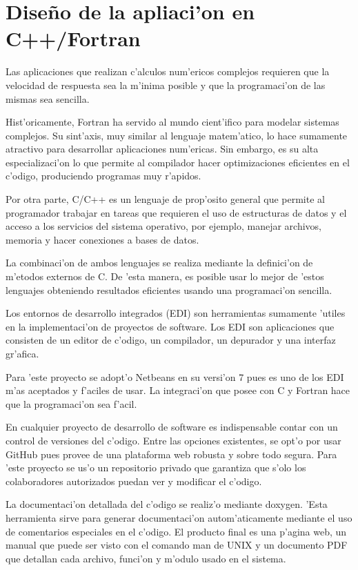 \section{Dise\~no de la apliaci'on en C++/Fortran}
  Las aplicaciones que realizan c'alculos num'ericos complejos requieren que la velocidad de respuesta sea la m'inima posible y que
  la programaci'on de las mismas sea sencilla.

  Hist'oricamente, Fortran ha servido al mundo cient'ifico para modelar sistemas complejos. Su sint'axis, 
  muy similar al lenguaje matem'atico, lo hace sumamente atractivo para desarrollar aplicaciones num'ericas. Sin embargo,
  es su alta especializaci'on lo que permite al compilador hacer optimizaciones eficientes en el c'odigo, produciendo
  programas muy r'apidos.

  Por otra parte, C/C++ es un lenguaje de prop'osito general que permite al programador trabajar en tareas que requieren
  el uso de estructuras de datos y el acceso a los servicios del sistema operativo, por ejemplo, manejar archivos, memoria y hacer 
  conexiones a bases de datos.

  La combinaci'on de ambos lenguajes se realiza mediante la definici'on de m'etodos externos de C. De 'esta manera, es posible
  usar lo mejor de 'estos lenguajes obteniendo resultados eficientes usando una programaci'on sencilla.


  Los entornos de desarrollo integrados (EDI) son herramientas sumamente 'utiles en la implementaci'on de proyectos de software.
  Los EDI son aplicaciones que consisten de un editor de c'odigo, un compilador, un depurador y una interfaz gr'afica.

  Para 'este proyecto se adopt'o Netbeans en su versi'on 7 pues es uno de los EDI m'as aceptados y f'aciles de usar. La integraci'on
  que posee con C y Fortran hace que la programaci'on sea f'acil.

  En cualquier proyecto de desarrollo de software es indispensable contar con un control de versiones del c'odigo.
  Entre las opciones existentes, se opt'o por usar GitHub pues provee de una plataforma web robusta y sobre todo segura. 
  Para 'este proyecto se us'o un repositorio privado que garantiza que s'olo los colaboradores autorizados puedan ver y modificar el c'odigo.

  La documentaci'on detallada del c'odigo se realiz'o mediante doxygen. 'Esta herramienta sirve para generar
  documentaci'on autom'aticamente mediante el uso de comentarios especiales en el c'odigo. El producto final es una p'agina web, un manual 
  que puede ser visto con el comando man de UNIX y un documento PDF que detallan cada archivo, funci'on y m'odulo usado en el sistema.
  

